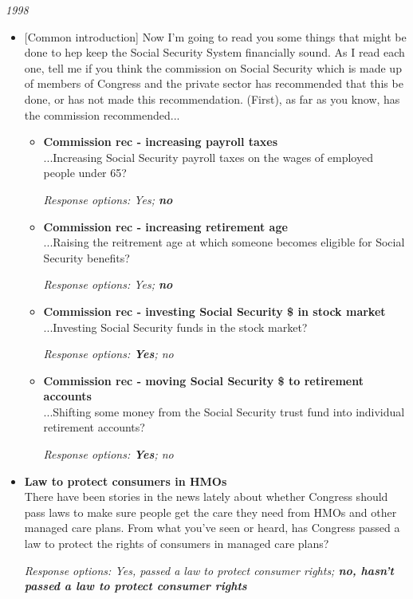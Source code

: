 \documentclass[12pt, letterpaper]{article}
\begin{document}
 \large \noindent \textit{1998} 
\normalsize 
\begin{itemize}
\item {[Common introduction] Now I'm going to read you some things that might be done to hep keep the Social Security System financially sound. As I read each one, tell me if you think the commission on Social Security which is made up of members of Congress and the private sector has recommended that this be done, or has not made this recommendation. (First), as far as you know, has the commission recommended...

   \begin{itemize}
\item \textbf{Commission rec - increasing payroll taxes} \\
...Increasing Social Security payroll taxes on the wages of employed people under 65?

\textit{Response options: Yes; \textbf{no}}
\end{itemize}

   \begin{itemize}
\item \textbf{Commission rec - increasing retirement age} \\
...Raising the reitrement age at which someone becomes eligible for Social Security benefits?

\textit{Response options: Yes; \textbf{no}}
\end{itemize}

   \begin{itemize}
\item \textbf{Commission rec - investing Social Security \$ in stock market} \\
...Investing Social Security funds in the stock market? 

\textit{Response options: \textbf{Yes}; no}
\end{itemize}

   \begin{itemize}
\item \textbf{Commission rec - moving Social Security \$ to retirement accounts} \\
...Shifting some money from the Social Security trust fund into individual retirement accounts?

\textit{Response options: \textbf{Yes}; no}
\end{itemize}}
\end{itemize}

   \begin{itemize}
\item \textbf{Law to protect consumers in HMOs} \\
There have been stories in the news lately about whether Congress should pass laws to make sure people get the care they need from HMOs and other managed care plans. From what you've seen or heard, has Congress passed a law to protect the rights of consumers in managed care plans?

\textit{Response options: Yes, passed a law to protect consumer rights; \textbf{no, hasn't passed a law to protect consumer rights}} \\
\end{itemize}
\end{document}
